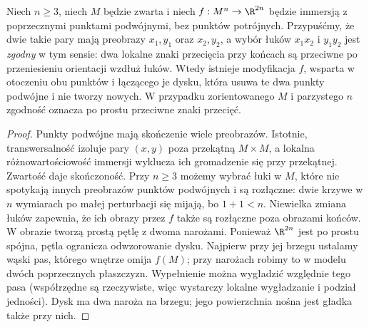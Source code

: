 \begin{stwierdzenie}
\label{lem:dysk-whitneya-15}
Niech $n\geq3$, niech $M$ będzie zwarta i niech
$f:M^n\to\R^{2n}$ będzie immersją z poprzecznymi punktami
podwójnymi, bez punktów potrójnych.
Przypuśćmy, że dwie takie pary mają
preobrazy $x_1,y_1$ oraz $x_2,y_2$,
a wybór łuków $x_1x_2$ i $y_1y_2$
jest \emph{zgodny} w tym sensie:
dwa lokalne znaki przecięcia przy końcach
są przeciwne po przeniesieniu orientacji
wzdłuż łuków. Wtedy istnieje modyfikacja
$f$, wsparta w otoczeniu obu punktów
i łączącego je dysku, która usuwa
te dwa punkty podwójne i nie tworzy nowych.
W przypadku zorientowanego $M$ i parzystego
$n$ zgodność oznacza po prostu przeciwne
znaki przecięć.
\end{stwierdzenie}
\begin{proof}
Punkty podwójne mają skończenie wiele preobrazów.
Istotnie, transwersalność izoluje pary $(x,y)$ poza
przekątną $M\times M$, a lokalna różnowartościowość
immersji wyklucza ich gromadzenie się przy przekątnej.
Zwartość daje skończoność.
Przy $n\geq3$ możemy wybrać łuki w $M$,
które nie spotykają innych preobrazów
punktów podwójnych i są rozłączne:
dwie krzywe w $n$ wymiarach po małej perturbacji
się mijają, bo $1+1<n$. Niewielka
zmiana łuków zapewnia, że ich obrazy
przez $f$ także są rozłączne poza
obrazami końców. W obrazie tworzą
prostą pętlę z dwoma narożami.
Ponieważ $\R^{2n}$ jest po prostu spójna,
pętla ogranicza odwzorowanie dysku. Najpierw przy
jej brzegu ustalamy wąski pas, którego wnętrze
omija $f(M)$; przy narożach robimy to w modelu
dwóch poprzecznych płaszczyzn. Wypełnienie można
wygładzić względnie tego pasa (współrzędne są
rzeczywiste, więc wystarczy lokalne wygładzanie
i podział jedności). Dysk ma dwa naroża na brzegu;
jego powierzchnia nośna jest gładka także przy nich.


\end{proof}
